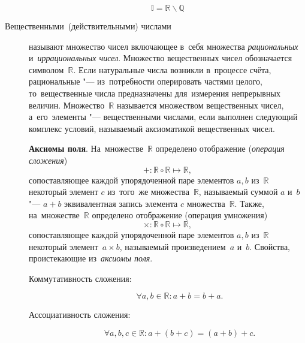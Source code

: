 \documentclass[]{scrartcl}
\begin{document}
\begin{description}
\begin{equation}
	\mathbb{I}=\mathbb{R}\backslash \mathbb{Q}
	\end{equation}
	\item[Вещественными~(действительными) числами] называют множество чисел включающее в~себя множества \emph{рациональных} и~\emph{иррациональных чисел}. Множество вещественных чисел обозначается символом~${\textstyle \mathbb{R}}$. Если натуральные числа возникли в~процессе счёта, рациональные "--- из~потребности оперировать частями целого, то~вещественные числа предназначены для~измерения непрерывных величин. Множество~${\textstyle \mathbb{R}}$ называется множеством вещественных чисел, а~его~элементы "--- вещественными числами, если выполнен следующий комплекс условий, называемый аксиоматикой вещественных чисел.
	
	\textbf{Аксиомы поля}. На~множестве~${\textstyle \mathbb{R}}$ определено отображение (\emph{операция сложения}) 
	\begin{equation}\label{eq:irrational-numbers-field-axioms-1}
	+:\mathbb{R} \circ \mathbb{R} \mapsto \mathbb{R},
	\end{equation}	
	сопоставляющее каждой упорядоченной паре элементов ${\textstyle a,b}$ из~${\textstyle \mathbb{R}}$ некоторый элемент ${\textstyle c}$ из~того~же множества~${\textstyle \mathbb{R}}$, называемый суммой ${\textstyle a}$ и~${\textstyle b}$ "--- ${\textstyle a+b}$ эквивалентная запись элемента ${\textstyle c}$ множества~${\textstyle \mathbb{R} }$.  Также, на~множестве~${\textstyle \mathbb{R}}$ определено отображение (операция умножения)
	\begin{equation}\label{eq:irrational-numbers-field-axioms-2}
	\times:\mathbb{R} \circ \mathbb{R} \mapsto \mathbb{R},
	\end{equation}
	сопоставляющее каждой упорядоченной паре элементов ${\textstyle a,b}$ из~${\textstyle \mathbb {R} }$ некоторый элемент~${\textstyle a \times b}$, называемый произведением~${\textstyle a}$ и~${\textstyle b}$. Свойства, проистекающие из~\emph{аксиомы поля}.
	\begin{description}
		\item[Коммутативность сложения:]
		\begin{equation}\label{eq:real-numbers-sum-commutativity}
		\forall a,b \in \mathbb{R}: a+b=b+a.
		\end{equation}
		\item[Ассоциативность сложения:]
		\begin{equation}\label{eq:real-numbers-sum-associativity}
		\forall a,b,c \in \mathbb{R}: a+(b+c)=(a+b)+c.
		\end{equation}

\end{description}
\end{description}
\end{document}

